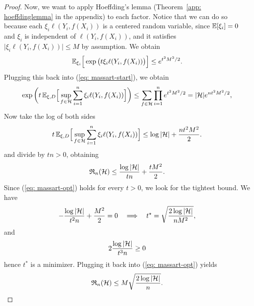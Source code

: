 \documentclass[reqno]{amsart}
\begin{document}
\begin{lemma}
\begin{proof}
        Now, we want to apply Hoeffding's lemma (Theorem~\ref{app: hoeffdinglemma} in the appendix) to each factor. Notice that we can do so because each $\xi_i \ell(Y_i,f(X_i))$ is a centered random variable, since $\mathbb{E}[\xi_i]=0$ and $\xi_i$ is independent of $\ell(Y_i,f(X_i))$, and it satisfies $\vert \xi_i \ell(Y_i,f(X_i)) \vert \le M$ by assumption. We obtain
        \begin{equation}
            \mathbb{E}_{\xi_i}\Big[\exp\big(t\xi_i \ell(Y_i,f(X_i))\big)\Big] \le e^{t^2M^2/2}.
        \end{equation}
        Plugging this back into (\ref{eq: massart-start}), we obtain
        \begin{equation}\label{eq: massart-hoeffding}
            \exp\bigg(t\, \mathbb{E}_{\xi,D} \Big[\sup_{f\in\mathcal{H}}\sum_{i=1}^n \xi_i \ell(Y_i,f(X_i))\Big]\bigg) \le \sum_{f\in\mathcal{H}}\prod_{i=1}^n e^{t^2M^2/2} = \vert \mathcal{H} \vert e^{nt^2M^2/2},
        \end{equation}
        Now take the log of both sides
        \begin{equation}
            t\, \mathbb{E}_{\xi,D} \Big[\sup_{f\in\mathcal{H}}\sum_{i=1}^n \xi_i \ell(Y_i,f(X_i))\Big] \le \log \vert \mathcal{H} \vert + \frac{nt^2M^2}{2}.
        \end{equation}
        and divide  by $tn>0$, obtaining
        \begin{equation}\label{eq: massart-opt}
            \mathfrak R_n(\mathcal{H}) \le \frac{\log\vert \mathcal{H}\vert}{tn} + \frac{tM^2}{2}.
        \end{equation}
        Since (\ref{eq: massart-opt}) holds for every $t>0$, we look for the tightest bound. We have
        \begin{equation}
            -\frac{\log\vert\mathcal{H}\vert}{t^2n} + \frac{M^2}{2} = 0 \quad \Longrightarrow \quad t^\star = \sqrt{\frac{2\log\vert\mathcal{H}\vert}{nM^2}},
        \end{equation}
        and
        \begin{equation}
            2\frac{\log\vert\mathcal{H}\vert}{t^3 n} \ge 0
        \end{equation}
        hence $t^*$ is a minimizer. Plugging it back into (\ref{eq: massart-opt}) yields
        \begin{equation}
            \mathfrak R_n(\mathcal{H}) \le M\sqrt{\frac{2\log\vert\mathcal{H}\vert}{n}}.
        \end{equation}
  
    \end{proof}
\end{lemma}
\end{document}
